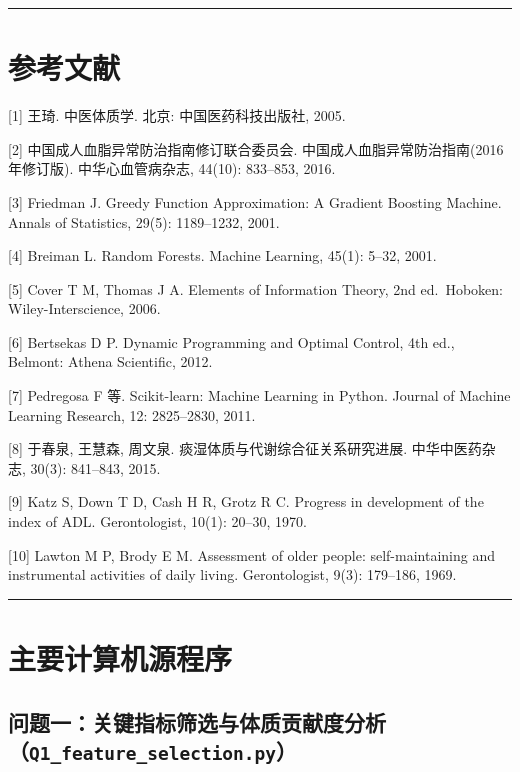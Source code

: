 \documentclass{MathorCupmodeling}
\begin{document}
\begin{center}\rule{0.5\linewidth}{0.5pt}\end{center}

\section{参考文献}\label{ux4e03ux53c2ux8003ux6587ux732e}

{[}1{]} 王琦. 中医体质学. 北京: 中国医药科技出版社, 2005.

{[}2{]} 中国成人血脂异常防治指南修订联合委员会. 中国成人血脂异常防治指南(2016 年修订版). 中华心血管病杂志, 44(10): 833--853, 2016.

{[}3{]} Friedman J. Greedy Function Approximation: A Gradient Boosting Machine. Annals of Statistics, 29(5): 1189--1232, 2001.

{[}4{]} Breiman L. Random Forests. Machine Learning, 45(1): 5--32, 2001.

{[}5{]} Cover T M, Thomas J A. Elements of Information Theory, 2nd ed.~Hoboken: Wiley-Interscience, 2006.

{[}6{]} Bertsekas D P. Dynamic Programming and Optimal Control, 4th ed., Belmont: Athena Scientific, 2012.

{[}7{]} Pedregosa F 等. Scikit-learn: Machine Learning in Python. Journal of Machine Learning Research, 12: 2825--2830, 2011.

{[}8{]} 于春泉, 王慧森, 周文泉. 痰湿体质与代谢综合征关系研究进展. 中华中医药杂志, 30(3): 841--843, 2015.

{[}9{]} Katz S, Down T D, Cash H R, Grotz R C. Progress in development of the index of ADL. Gerontologist, 10(1): 20--30, 1970.

{[}10{]} Lawton M P, Brody E M. Assessment of older people: self-maintaining and instrumental activities of daily living. Gerontologist, 9(3): 179--186, 1969.

\begin{center}\rule{0.5\linewidth}{0.5pt}\end{center}

\appendix
\section{主要计算机源程序}\label{ux9644ux5f55ux4e3bux8981ux8ba1ux7b97ux673aux6e90ux7a0bux5e8f}

\subsection{\texorpdfstring{问题一：关键指标筛选与体质贡献度分析（\texttt{Q1\_feature\_selection.py}）}{问题一：关键指标筛选与体质贡献度分析（Q1\_feature\_selection.py）}}\label{a.1-ux95eeux9898ux4e00ux5173ux952eux6307ux6807ux7b5bux9009ux4e0eux4f53ux8d28ux8d21ux732eux5ea6ux5206ux6790q1_feature_selection.py}
\end{document}
